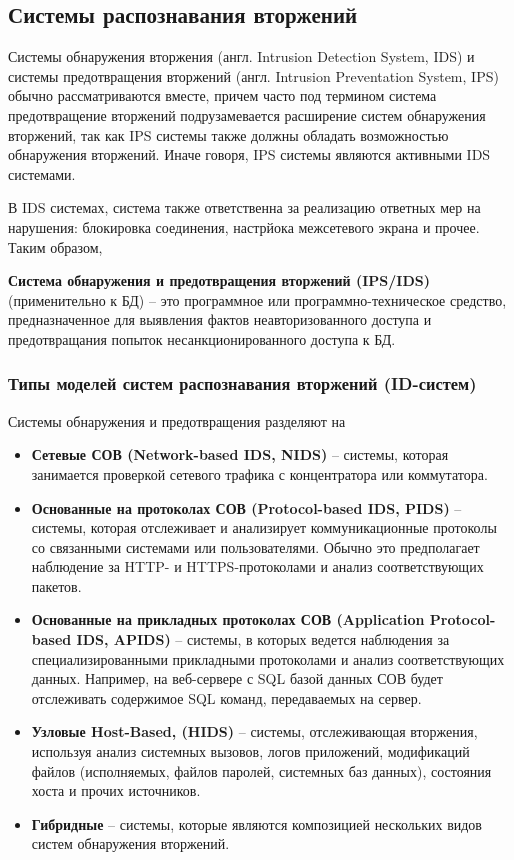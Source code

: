 \subsection{Системы распознавания вторжений}

Системы обнаружения вторжения (англ. Intrusion Detection System, IDS) и 
системы предотвращения вторжений (англ. Intrusion Preventation System, IPS) 
обычно рассматриваются вместе, причем часто под термином система предотвращение вторжений подрузамевается
расширение систем обнаружения вторжений, так как IPS системы также должны обладать возможностью обнаружения
вторжений. Иначе говоря, IPS системы являются активными IDS системами.

В IDS системах, система также ответственна за реализацию ответных мер на нарушения: блокировка соединения,
настрйока межсетевого экрана и прочее. Таким образом,

\textbf{Система обнаружения и предотвращения вторжений (IPS/IDS)} (применительно к БД) -- это 
программное или программно-техническое средство, предназначенное для выявления фактов 
неавторизованного доступа и предотвращания попыток несанкционированного доступа к БД.

\subsubsection*{Типы моделей систем распознавания вторжений (ID-систем)}

Системы обнаружения и предотвращения разделяют на

\begin{itemize}
	\item \textbf{Сетевые СОВ (Network-based IDS, NIDS)} -- системы, 
	которая занимается проверкой сетевого трафика с концентратора или коммутатора.
	\item \textbf{Основанные на протоколах СОВ (Protocol-based IDS, PIDS)} -- системы, 
	которая отслеживает и анализирует коммуникационные протоколы со связанными системами или пользователями.
	Обычно это предполагает наблюдение за HTTP- и HTTPS-протоколами и анализ соответствующих пакетов.
	\item \textbf{Основанные на прикладных протоколах СОВ (Application Protocol-based IDS, APIDS)} -- системы, 
	в которых ведется наблюдения за специализированными прикладными протоколами и анализ соответствующих 
	данных. Например, на веб-сервере с SQL базой данных СОВ будет отслеживать содержимое SQL команд, 
	передаваемых на сервер.
	\item \textbf{Узловые Host-Based, (HIDS)} -- системы, 
	отслеживающая вторжения, используя анализ системных вызовов, логов приложений, 
	модификаций файлов (исполняемых, файлов паролей, системных баз данных), 
	состояния хоста и прочих источников. 
	\item \textbf{Гибридные} -- системы, которые являются композицией нескольких видов 
	систем обнаружения вторжений.
\end{itemize}

